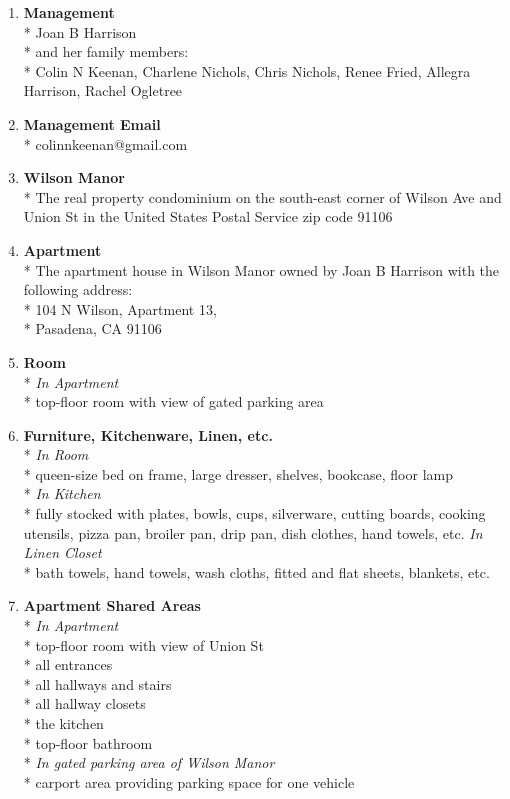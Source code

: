 \documentclass[12pt,letterpaper]{article}
\newcommand{\mom}{Joan B Harrison}
\newcommand{\management}{Management}
\newcommand{\myemail}{Management Email}
\newcommand{\condo}{Wilson Manor}
\newcommand{\apt}{Apartment}
\newcommand{\room}{Room}
\newcommand{\furniture}{Furniture, Kitchenware, Linen, etc.}
\newcommand{\shared}{Apartment Shared Areas}
\begin{document}
\begin{multicols}{2}
	\begin{enumerate} 
		\item \textbf{\management{}}\\* \label{management}
			\noindent \mom{}\\*
			and her family members:\\*
			Colin N Keenan,
			Charlene Nichols,
			Chris Nichols,
			Renee Fried,
			Allegra Harrison,
			Rachel Ogletree
				
		\item \textbf{\myemail{}}\\* \label{myemail}
			colinnkeenan@gmail.com

		\item \textbf{\condo{}}\\* \label{condo}
			The real property condominium on the south-east corner of Wilson Ave and Union St in the United States Postal Service zip code 91106

		\item \textbf{\apt{}}\\* \label{apt}
			The apartment house in \condo{} owned by \mom{} with the following address:\\*
			104 N Wilson, \apt{} 13,\\* 
			Pasadena, CA  91106

		\item \textbf{\room{}}\\* \label{room}
			\textit{In \apt{}}\\*
			top-floor room with view of gated parking area


		\item \textbf{\furniture{}}\\* \label{furniture}
			\textit{In \room{}}\\*
			queen-size bed on frame, large dresser, shelves, bookcase, floor lamp\\*
			\textit{In Kitchen}\\*
			fully stocked with plates, bowls, cups, silverware, cutting boards, cooking utensils, pizza pan, broiler pan, drip pan, dish clothes, hand towels, etc.
			\textit{In Linen Closet}\\*
			bath towels, hand towels, wash cloths, fitted and flat sheets, blankets, etc.

		\item \textbf{\shared{}}\\* \label{shared}
			\textit{In \apt{}}\\*
			top-floor room with view of Union St\\*
			all entrances\\*
			all hallways and stairs\\*
			all hallway closets\\*
			the kitchen\\*
			top-floor bathroom\\*
			\textit{In gated parking area of \condo{}}\\*
			carport area providing parking space for one vehicle
			

\end{enumerate}
\end{multicols}
\end{document}
